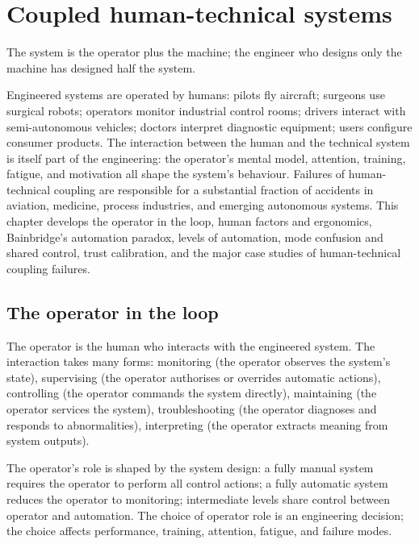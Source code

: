 \chapter{Coupled human-technical systems}
\label{vol09:ch16}

\epigraph{The system is the operator plus the machine; the engineer who designs only the machine has designed half the system.}{}


\noindent
Engineered systems are operated by humans: pilots fly aircraft; surgeons use surgical robots; operators monitor industrial control rooms; drivers interact with semi-autonomous vehicles; doctors interpret diagnostic equipment; users configure consumer products. The interaction between the human and the technical system is itself part of the engineering: the operator's mental model, attention, training, fatigue, and motivation all shape the system's behaviour. Failures of human-technical coupling are responsible for a substantial fraction of accidents in aviation, medicine, process industries, and emerging autonomous systems. This chapter develops the operator in the loop, human factors and ergonomics, Bainbridge's automation paradox, levels of automation, mode confusion and shared control, trust calibration, and the major case studies of human-technical coupling failures.

\section{The operator in the loop}

The operator is the human who interacts with the engineered system. The interaction takes many forms: monitoring (the operator observes the system's state), supervising (the operator authorises or overrides automatic actions), controlling (the operator commands the system directly), maintaining (the operator services the system), troubleshooting (the operator diagnoses and responds to abnormalities), interpreting (the operator extracts meaning from system outputs).

The operator's role is shaped by the system design: a fully manual system requires the operator to perform all control actions; a fully automatic system reduces the operator to monitoring; intermediate levels share control between operator and automation. The choice of operator role is an engineering decision; the choice affects performance, training, attention, fatigue, and failure modes.


